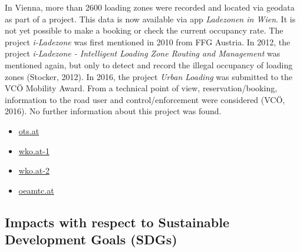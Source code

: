 \documentclass[
]{book}
\providecommand{\tightlist}{%
  \setlength{\itemsep}{0pt}\setlength{\parskip}{0pt}}
\begin{document}
In Vienna, more than 2600 loading zones were recorded and located via geodata as part of a project. This data is now available via app \emph{Ladezonen in Wien}. It is not yet possible to make a booking or check the current occupancy rate. The project \emph{i-Ladezone} was first mentioned in 2010 from FFG Austria. In 2012, the project \emph{i-Ladezone - Intelligent Loading Zone Routing and Management} was mentioned again, but only to detect and record the illegal occupancy of loading zones (Stocker, 2012). In 2016, the project \emph{Urban Loading} was submitted to the VCÖ Mobility Award. From a technical point of view, reservation/booking, information to the road user and control/enforcement were considered (VCÖ, 2016). No further information about this project was found.

\begin{itemize}
\tightlist
\item
  \href{https://www.ots.at/presseaussendung/OTS_20150123_OTS0044/simple-stressfreie-ladezonensuche-wk-wien-praesentiert-neue-app}{ots.at}
\item
  \href{https://www.wko.at/service/verkehr-betriebsstandort/Ladezonen-Nutzung.html}{wko.at-1}
\item
  \href{https://www.wko.at/service/w/verkehr-betriebsstandort/ladezone-wien-app.html}{wko.at-2}
\item
  \href{https://www2.ffg.at/verkehr/projekte.php?id=805\&lang=de\&browse=programm}{oeamtc.at}
\end{itemize}

\hypertarget{impacts-with-respect-to-sustainable-development-goals-sdgs-24}{%
\subsection*{Impacts with respect to Sustainable Development Goals (SDGs)}\label{impacts-with-respect-to-sustainable-development-goals-sdgs-24}}
\end{document}
